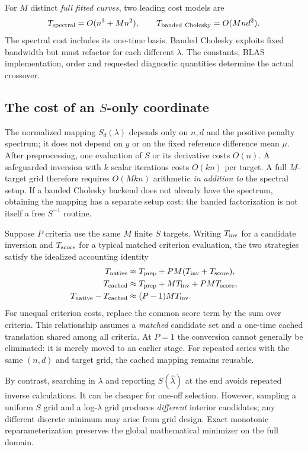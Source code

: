 For $M$ distinct \emph{full fitted curves},
two leading cost models are
\[
 T_{\rm spectral}=O(n^3+Mn^2),\qquad
 T_{\rm banded\ Cholesky}=O(Mnd^2).
\]
The spectral cost includes its one-time basis.
Banded Cholesky exploits fixed bandwidth
but must refactor for each different $\lambda$.
The constants, BLAS implementation, order
and requested diagnostic quantities determine
the actual crossover.

\subsection{The cost of an $S$-only coordinate}
\label{sec:sncs-mapping-cost}
The normalized mapping $S_d(\lambda)$ depends
only on $n,d$ and the positive penalty spectrum;
it does not depend on $y$ or on the fixed
reference difference mean $\mu$.
After preprocessing, one evaluation of $S$
or its derivative costs $O(n)$.
A safeguarded inversion with $k$ scalar
iterations costs $O(kn)$ per target.
A full $M$-target grid therefore requires
$O(Mkn)$ arithmetic \emph{in addition to}
the spectral setup. If a banded Cholesky
backend does not already have the spectrum,
obtaining the mapping has a separate setup
cost; the banded factorization is not itself
a free $S^{-1}$ routine.

Suppose $P$ criteria use the same $M$ finite
$S$ targets. Writing $T_{\rm inv}$ for
a candidate inversion and $T_{\rm score}$
for a typical matched criterion evaluation,
the two strategies satisfy the idealized
accounting identity
\begin{equation}
\begin{aligned}
T_{\rm native}&\approx T_{\rm prep}
  +PM(T_{\rm inv}+T_{\rm score}),\\
T_{\rm cached}&\approx T_{\rm prep}
  +MT_{\rm inv}+PMT_{\rm score},\\
T_{\rm native}-T_{\rm cached}
  &\approx (P-1)MT_{\rm inv}.
\end{aligned}
\label{eq:sncs-mapping-reuse}
\end{equation}
For unequal criterion costs, replace the
common score term by the sum over criteria.
This relationship assumes a \emph{matched}
candidate set and a one-time cached
translation shared among all criteria.
At $P=1$ the conversion cannot generally
be eliminated: it is merely moved to an
earlier stage. For repeated series with the
same $(n,d)$ and target grid, the cached
mapping remains reusable.

By contrast, searching in $\lambda$
and reporting $S(\widehat\lambda)$
at the end avoids repeated inverse
calculations. It can be cheaper for
one-off selection. However, sampling a
uniform $S$ grid and a log-$\lambda$
grid produces \emph{different} interior
candidates; any different discrete
minimum may arise from grid design.
Exact monotonic reparameterization
preserves the global mathematical
minimizer on the full domain.

